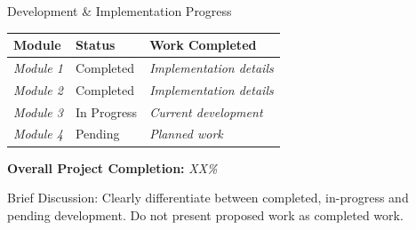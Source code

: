 \documentclass[aspectratio=169,11pt]{beamer}
\newcommand{\smallnote}[1]{%
\vspace{0.08cm}
{\scriptsize\color{GEUGrey}#1}
}
\newcommand{\placeholder}[1]{%
\textit{\color{GEUGrey}#1}
}
\begin{document}
\begin{frame}{Development \& Implementation Progress}

\scriptsize

\begin{center}

\renewcommand{\arraystretch}{1.25}

\begin{tabularx}{.96\textwidth}
{@{}p{3cm}p{2.2cm}X@{}}

\toprule
\textbf{Module} &
\textbf{Status} &
\textbf{Work Completed}\\
\midrule

\placeholder{Module 1} &
Completed &
\placeholder{Implementation details}\\

\placeholder{Module 2} &
Completed &
\placeholder{Implementation details}\\

\placeholder{Module 3} &
In Progress &
\placeholder{Current development}\\

\placeholder{Module 4} &
Pending &
\placeholder{Planned work}\\

\bottomrule

\end{tabularx}

\end{center}

\vspace{3mm}

\begin{center}
\colorbox{GEULightBlue}{
\parbox{.65\textwidth}{
\centering
\textbf{Overall Project Completion:}
\placeholder{XX\%}
}}
\end{center}

\vfill

\smallnote{
Brief Discussion: Clearly differentiate between completed,
in-progress and pending development. Do not present proposed work
as completed work.
}

\end{frame}
\end{document}
